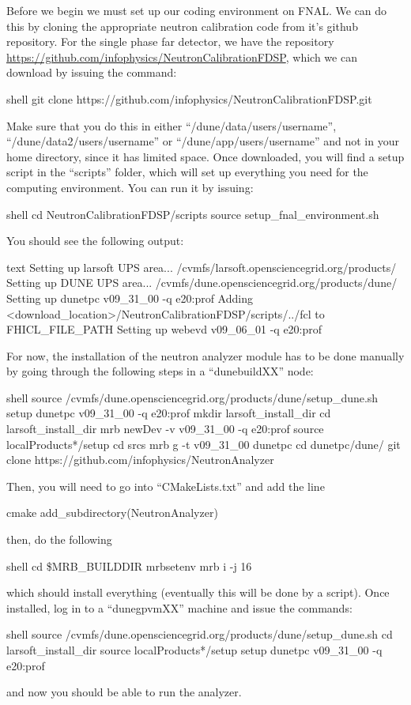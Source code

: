 \documentclass[8pt]{refart}
\begin{document}
Before we begin we must set up our coding environment on FNAL.  We can do this by cloning the appropriate neutron calibration code from it's github repository.  For the single phase far detector, we have the repository \url{https://github.com/infophysics/NeutronCalibrationFDSP}, which we can download by issuing the command:
\begin{code}{shell}
git clone https://github.com/infophysics/NeutronCalibrationFDSP.git
\end{code}
Make sure that you do this in either ``/dune/data/users/username'', ``/dune/data2/users/username'' or ``/dune/app/users/username'' and not in your home directory, since it has limited space.  Once downloaded, you will find a setup script in the ``scripts'' folder, which will set up everything you need for the computing environment.  You can run it by issuing:
\begin{code}{shell}
cd NeutronCalibrationFDSP/scripts
source setup_fnal_environment.sh
\end{code}
You should see the following output:
\begin{code}{text}
Setting up larsoft UPS area... /cvmfs/larsoft.opensciencegrid.org/products/
Setting up DUNE UPS area... /cvmfs/dune.opensciencegrid.org/products/dune/
Setting up dunetpc v09_31_00 -q e20:prof
Adding <download_location>/NeutronCalibrationFDSP/scripts/../fcl to FHICL_FILE_PATH
Setting up webevd v09_06_01 -q e20:prof
\end{code}

For now, the installation of the neutron analyzer module has to be done manually by going through the following steps in a ``dunebuildXX'' node:
\begin{code}{shell}
source /cvmfs/dune.opensciencegrid.org/products/dune/setup_dune.sh
setup dunetpc v09_31_00 -q e20:prof
mkdir larsoft_install_dir
cd larsoft_install_dir
mrb newDev -v v09_31_00 -q e20:prof
source localProducts*/setup
cd srcs
mrb g -t v09_31_00 dunetpc
cd dunetpc/dune/
git clone https://github.com/infophysics/NeutronAnalyzer
\end{code}
Then, you will need to go into ``CMakeLists.txt'' and add the line
\begin{code}{cmake}
add_subdirectory(NeutronAnalyzer)
\end{code}
then, do the following
\begin{code}{shell}
cd \$MRB_BUILDDIR
mrbsetenv
mrb i -j 16
\end{code}
which should install everything (eventually this will be done by a script).  Once installed, log in to a ``dunegpvmXX'' machine and issue the commands:
\begin{code}{shell}
source /cvmfs/dune.opensciencegrid.org/products/dune/setup_dune.sh
cd larsoft_install_dir
source localProducts*/setup
setup dunetpc v09_31_00 -q e20:prof
\end{code}
and now you should be able to run the analyzer.
\end{document}
